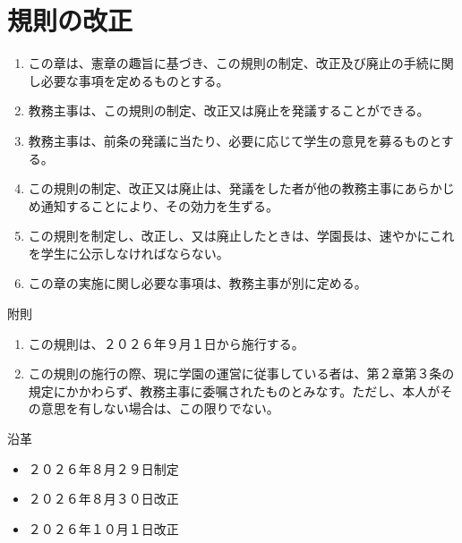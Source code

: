 \newpage
\chapter{規則の改正}
\begin{enumerate}[label=第\arabic*条　]
  \item この章は、憲章の趣旨に基づき、この規則の制定、改正及び廃止の手続に関し必要な事項を定めるものとする。
  \item 教務主事は、この規則の制定、改正又は廃止を発議することができる。
  \item 教務主事は、前条の発議に当たり、必要に応じて学生の意見を募るものとする。
  \item この規則の制定、改正又は廃止は、発議をした者が他の教務主事にあらかじめ通知することにより、その効力を生ずる。
  \item この規則を制定し、改正し、又は廃止したときは、学園長は、速やかにこれを学生に公示しなければならない。
  \item この章の実施に関し必要な事項は、教務主事が別に定める。
\end{enumerate}

\bigskip
\noindent 附則
\begin{enumerate}[label=\arabic*　,leftmargin=*]
  \item この規則は、２０２６年９月１日から施行する。
  \item この規則の施行の際、現に学園の運営に従事している者は、第２章第３条の規定にかかわらず、教務主事に委嘱されたものとみなす。ただし、本人がその意思を有しない場合は、この限りでない。
\end{enumerate}

\bigskip
\noindent 沿革
\begin{itemize}
\item ２０２６年８月２９日制定\\
\item ２０２６年８月３０日改正\\
\item ２０２６年１０月１日改正
\end{itemize}